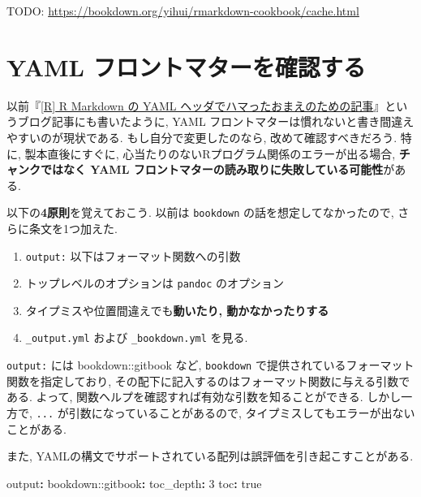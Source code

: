 \documentclass[
  xelatex,ja=standard,jafont=noto]{bxjsbook}
\newenvironment{Shaded}{\begin{snugshade}}{\end{snugshade}}
\newcommand{\AttributeTok}[1]{\textcolor[rgb]{0.77,0.63,0.00}{#1}}
\newcommand{\CharTok}[1]{\textcolor[rgb]{0.31,0.60,0.02}{#1}}
\newcommand{\DecValTok}[1]{\textcolor[rgb]{0.00,0.00,0.81}{#1}}
\newcommand{\FunctionTok}[1]{\textcolor[rgb]{0.00,0.00,0.00}{#1}}
\newcommand{\KeywordTok}[1]{\textcolor[rgb]{0.13,0.29,0.53}{\textbf{#1}}}
\providecommand{\tightlist}{%
  \setlength{\itemsep}{0pt}\setlength{\parskip}{0pt}}
\theoremstyle{definition}
\theoremstyle{definition}
\theoremstyle{definition}
\theoremstyle{definition}
\theoremstyle{remark}
\begin{document}
TODO: \url{https://bookdown.org/yihui/rmarkdown-cookbook/cache.html}

\hypertarget{yaml-ux30d5ux30edux30f3ux30c8ux30deux30bfux30fcux3092ux78baux8a8dux3059ux308b}{%
\section{YAML
フロントマターを確認する}\label{yaml-ux30d5ux30edux30f3ux30c8ux30deux30bfux30fcux3092ux78baux8a8dux3059ux308b}}

以前『\href{https://ill-identified.hatenablog.com/entry/2020/09/05/202403}{{[}R{]}
R Markdown の YAML
ヘッダでハマったおまえのための記事}』というブログ記事にも書いたように,
YAML フロントマターは慣れないと書き間違えやすいのが現状である.
もし自分で変更したのなら, 改めて確認すべきだろう. 特に,
製本直後にすぐに, 心当たりのないRプログラム関係のエラーが出る場合,
\textbf{チャンクではなく YAML
フロントマターの読み取りに失敗している可能性}がある.

以下の\textbf{4原則}を覚えておこう. 以前は \texttt{bookdown}
の話を想定してなかったので, さらに条文を1つ加えた.

\begin{enumerate}
\def\labelenumi{\arabic{enumi}.}
\tightlist
\item
  \texttt{output:} 以下はフォーマット関数への引数
\item
  トップレベルのオプションは \texttt{pandoc} のオプション
\item
  タイプミスや位置間違えでも\textbf{動いたり, 動かなかったりする}
\item
  \texttt{\_output.yml} および \texttt{\_bookdown.yml} を見る.
\end{enumerate}

\texttt{output:} には bookdown::gitbook など, \texttt{bookdown}
で提供されているフォーマット関数を指定しており,
その配下に記入するのはフォーマット関数に与える引数である. よって,
関数ヘルプを確認すれば有効な引数を知ることができる. しかし一方で,
\texttt{...} が引数になっていることがあるので,
タイプミスしてもエラーが出ないことがある.

また, YAMLの構文でサポートされている配列は誤評価を引き起こすことがある.

\begin{Shaded}
\begin{Highlighting}[]
\FunctionTok{output}\KeywordTok{:}
\AttributeTok{  bookdown:}\FunctionTok{:gitbook}\KeywordTok{:}
\AttributeTok{    }\FunctionTok{toc\_depth}\KeywordTok{:}\AttributeTok{ }\DecValTok{3}
\AttributeTok{    }\FunctionTok{toc}\KeywordTok{:}\AttributeTok{ }\CharTok{true}
\end{Highlighting}
\end{Shaded}
\end{document}
